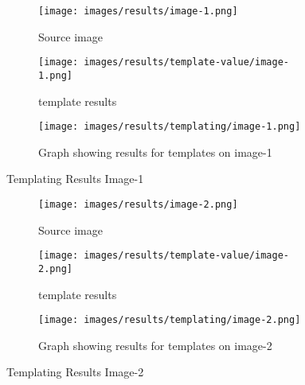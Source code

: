 \begin{figure}[H]
    \centering
    
    \begin{subfigure}{0.5\textwidth}
        \centering
        \texttt{[image: images/results/image-1.png]}
        \caption{Source image}
    \end{subfigure}%
    \begin{subfigure}{0.5\textwidth}
        \centering
        \texttt{[image: images/results/template-value/image-1.png]}
        \caption{template results}
    \end{subfigure}
    \begin{subfigure}{\textwidth}
    \centering
        \texttt{[image: images/results/templating/image-1.png]}
        \caption{Graph showing results for templates on image-1}
    \end{subfigure}
    
    \caption{Templating Results Image-1}
    \label{fig:Templating-Results-Image-1}
\end{figure}

\begin{figure}[H]
    \centering
    
    \begin{subfigure}{0.5\textwidth}
        \centering
        \texttt{[image: images/results/image-2.png]}
        \caption{Source image}
    \end{subfigure}%
    \begin{subfigure}{0.5\textwidth}
        \centering
        \texttt{[image: images/results/template-value/image-2.png]}
        \caption{template results}
    \end{subfigure}
    \begin{subfigure}{\textwidth}
    \centering
        \texttt{[image: images/results/templating/image-2.png]}
        \caption{Graph showing results for templates on image-2}
    \end{subfigure}
    
    \caption{Templating Results Image-2}
    \label{fig:Templating-Results-Image-2}
\end{figure}

